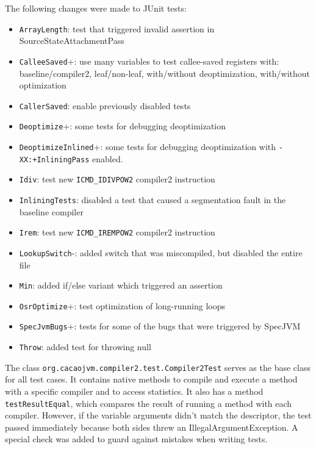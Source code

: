 \documentclass[draft,final]{vutinfth} %
\begin{document}
    The following changes were made to JUnit tests:
    \begin{itemize}
        \item \lstinline{ArrayLength}: test that triggered invalid assertion in SourceStateAttachmentPass
        \item \lstinline{CalleeSaved}+: use many variables to test callee-saved registers with: baseline/compiler2, leaf/non-leaf, with/without deoptimization, with/without optimization
        \item \lstinline{CallerSaved}: enable previously disabled tests
        \item \lstinline{Deoptimize}+: some tests for debugging deoptimization
        \item \lstinline{DeoptimizeInlined}+: some tests for debugging deoptimization with \lstinline{-XX:+InliningPass} enabled.
        \item \lstinline{Idiv}: test new \lstinline{ICMD_IDIVPOW2} compiler2 instruction
        \item \lstinline{InliningTests}: disabled a test that caused a segmentation fault in the baseline compiler
        \item \lstinline{Irem}: test new \lstinline{ICMD_IREMPOW2} compiler2 instruction
        \item \lstinline{LookupSwitch}-: added switch that was miscompiled, but disabled the entire file
        \item \lstinline{Min}: added if/else variant which triggered an assertion
        \item \lstinline{OsrOptimize}+: test optimization of long-running loops
        \item \lstinline{SpecJvmBugs}+: tests for some of the bugs that were triggered by SpecJVM
        \item \lstinline{Throw}: added test for throwing null
    \end{itemize}

    The class \lstinline{org.cacaojvm.compiler2.test.Compiler2Test} serves as the base class for all test cases.
    It contains native methods to compile and execute a method with a specific compiler and to access statistics.
    It also has a method \lstinline{testResultEqual},
    which compares the result of running a method with each compiler.
    However, if the variable arguments didn't match the descriptor,
    the test passed immediately because both sides threw an IllegalArgumentException.
    A special check was added to guard against mistakes when writing tests.
\end{document}
